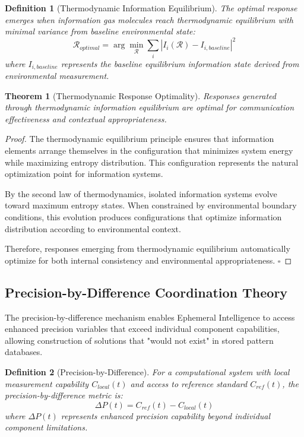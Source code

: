 \documentclass[12pt,a4paper]{article}
\newtheorem{theorem}{Theorem}
\newtheorem{definition}{Definition}
\begin{document}
\begin{definition}[Thermodynamic Information Equilibrium]
The optimal response emerges when information gas molecules reach thermodynamic equilibrium with minimal variance from baseline environmental state:
\begin{equation}
\mathcal{R}_{optimal} = \arg\min_{\mathcal{R}} \sum_{i} |I_i(\mathcal{R}) - I_{i,baseline}|^2
\end{equation}
where $I_{i,baseline}$ represents the baseline equilibrium information state derived from environmental measurement.
\end{definition}

\begin{theorem}[Thermodynamic Response Optimality]
Responses generated through thermodynamic information equilibrium are optimal for communication effectiveness and contextual appropriateness.
\end{theorem}

\begin{proof}
The thermodynamic equilibrium principle ensures that information elements arrange themselves in the configuration that minimizes system energy while maximizing entropy distribution. This configuration represents the natural optimization point for information systems.

By the second law of thermodynamics, isolated information systems evolve toward maximum entropy states. When constrained by environmental boundary conditions, this evolution produces configurations that optimize information distribution according to environmental context.

Therefore, responses emerging from thermodynamic equilibrium automatically optimize for both internal consistency and environmental appropriateness. $\square$
\end{proof}

\subsection{Precision-by-Difference Coordination Theory}

The precision-by-difference mechanism enables Ephemeral Intelligence to access enhanced precision variables that exceed individual component capabilities, allowing construction of solutions that "would not exist" in stored pattern databases.

\begin{definition}[Precision-by-Difference]
For a computational system with local measurement capability $C_{local}(t)$ and access to reference standard $C_{ref}(t)$, the precision-by-difference metric is:
\begin{equation}
\Delta P(t) = C_{ref}(t) - C_{local}(t)
\end{equation}
where $\Delta P(t)$ represents enhanced precision capability beyond individual component limitations.
\end{definition}
\end{document}
